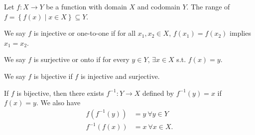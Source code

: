 \begin{definition*}
    Let \(f: X \to Y\) be a function with domain \(X\) and codomain \(Y\). The range of \(f = \left\{ f(x) \mid x \in X \right\} \subseteq Y\). 
    
    \begin{definition}[injective] \label{def: injective}
        We say \(f\) is injective or one-to-one if for all \(x_1, x_2 \in X\), \(f(x_1) = f(x_2)\) implies \(x_1 = x_2\).    
    \end{definition}

    \begin{definition}[surjective] \label{def: surjective}
        We say \(f\) is surjective or onto if for every \(y \in Y\), \(\exists x \in X\) s.t. \(f(x) = y\).    
    \end{definition}

    \begin{definition}[bijective] \label{def: bijective}
        We say \(f\) is bijective if \(f\) is injective and surjective.  
    \end{definition}
\end{definition*}

\begin{corollary}
    If \(f\) is bijective, then there exists \(f^{-1}: Y \to X\) defined by \(f^{-1}(y) = x\) if \(f(x) = y\). We also have 
    \begin{align*}
        f \left( f^{-1} (y) \right) &= y \ \forall y \in Y \\
        f^{-1} \left( f(x) \right) &= x \ \forall x \in X.
    \end{align*}
\end{corollary}

